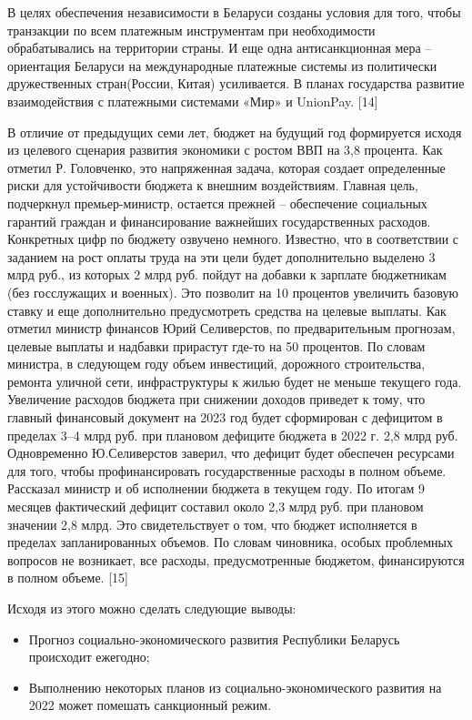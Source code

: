 \documentclass[14pt,a4paper]{article}
\begin{document}
    \par
    В целях обеспечения независимости в Беларуси созданы условия для того, чтобы транзакции по всем платежным инструментам при необходимости обрабатывались на территории страны.
    И еще одна антисанкционная мера – ориентация Беларуси на международные платежные системы из политически дружественных стран(России, Китая) усиливается.
    В планах государства развитие взаимодействия с платежными системами «Мир» и UnionPay. [14]
    \par
    В отличие от предыдущих семи
    лет, бюджет на будущий год формируется исходя из целевого сценария развития экономики с ростом ВВП на 3,8 процента.
    Как отметил Р. Головченко, это напряженная задача, которая создает определенные риски для устойчивости бюджета к внешним воздействиям.
    Главная цель, подчеркнул премьер-министр, остается прежней – обеспечение социальных гарантий граждан и финансирование важнейших государственных расходов.
    Конкретных цифр по бюджету озвучено немного.
    Известно, что в соответствии с заданием на рост оплаты труда на эти цели будет дополнительно выделено 3 млрд руб., из которых 2 млрд руб.
    пойдут на добавки к зарплате бюджетникам (без госслужащих и военных).
    Это позволит на 10 процентов увеличить базовую ставку и еще дополнительно предусмотреть средства на целевые выплаты.
    Как отметил министр финансов Юрий Селиверстов, по предварительным прогнозам, целевые выплаты и надбавки прирастут где-то на 50 процентов.
    По словам министра, в следующем году объем инвестиций, дорожного строительства, ремонта уличной сети, инфраструктуры к жилью будет не меньше текущего года.
    Увеличение расходов бюджета при снижении доходов приведет к тому, что главный финансовый документ на 2023 год будет сформирован с дефицитом в пределах 3–4 млрд руб. при плановом дефиците бюджета в 2022 г. 2,8 млрд руб.
    Одновременно Ю.Селиверстов заверил, что дефицит будет обеспечен ресурсами для того, чтобы профинансировать государственные расходы в полном объеме.
    Рассказал министр и об исполнении бюджета в текущем году.
    По итогам 9 месяцев фактический дефицит составил около 2,3 млрд руб. при плановом значении 2,8 млрд.
    Это свидетельствует о том, что бюджет исполняется в пределах запланированных объемов.
    По словам чиновника, особых проблемных вопросов не возникает, все расходы, предусмотренные бюджетом, финансируются в полном объеме.
    [15]
    \par
    Исходя из этого можно сделать следующие выводы:
    \begin{itemize}
        \item Прогноз социально-экономического развития Республики Беларусь происходит ежегодно;
        \item Выполнению некоторых планов из социально-экономического развития на 2022 может помешать санкционный режим.
    \end{itemize}
\end{document}
